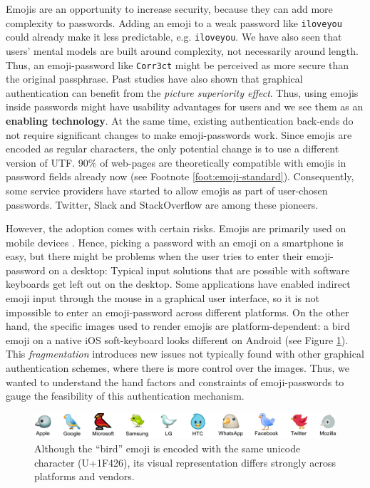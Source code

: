 Emojis are an opportunity to increase security, because they can add more complexity to passwords. Adding an emoji to a weak password like \texttt{iloveyou} could already make it less predictable, e.g. \texttt{iloveyou}. We have also seen that users' mental models are built around complexity, not necessarily around length. Thus, an emoji-password like \texttt{Corr3ct} might be perceived as more secure than the original passphrase. Past studies have also shown that graphical authentication can benefit from the \textit{picture superiority effect}. Thus, using emojis inside passwords might have usability advantages for users and we see them as an \textbf{enabling technology}. At the same time, existing authentication back-ends do not require significant changes to make emoji-passwords work. Since emojis are encoded as regular characters, the only potential change is to use a different version of UTF. 90\% of web-pages are theoretically compatible with emojis in password fields already now (see Footnote \ref{foot:emoji-standard}). Consequently, some  service providers have started to allow emojis as part of user-chosen passwords. Twitter, Slack and StackOverflow are among these pioneers. 

However, the adoption comes with certain risks. Emojis are primarily used on mobile devices \cite{EmogiResearch2016}. Hence, picking a password with an emoji on a smartphone is easy, but there might be problems when the user tries to enter their emoji-password on a desktop: Typical input solutions that are possible with software keyboards get left out on the desktop. Some applications have enabled indirect emoji input through the mouse in a graphical user interface, so it is not impossible to enter an emoji-password across different platforms. On the other hand, the specific images used to render emojis are platform-dependent: a bird emoji on a native iOS soft-keyboard looks different on Android (see Figure \ref{fig:emojipasswords:emoji-bird-comparison}). This \textit{fragmentation} introduces new issues not typically found with other graphical authentication schemes, where there is more control over the images. 
Thus, we wanted to understand the hand factors and constraints of emoji-passwords to gauge the feasibility of this authentication mechanism.

\begin{figure}
	\centering
	\includegraphics[width=\linewidth]{figures/emojipasswords/emoji-bird-comparison}
	\caption{
		\label{fig:emojipasswords:emoji-bird-comparison}
		Although the ``bird'' emoji is encoded with the same unicode character (U+1F426), its visual representation differs strongly across platforms and vendors.
	}
\end{figure}

